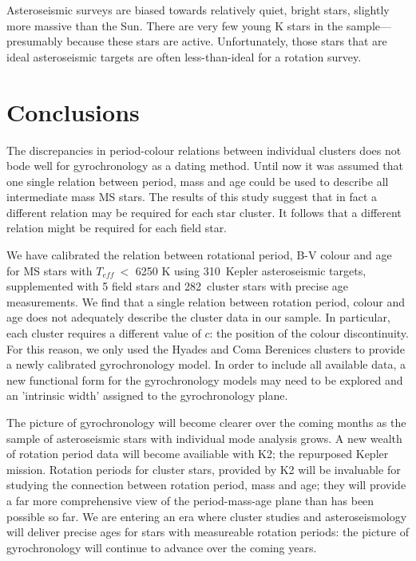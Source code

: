 \documentclass[10pt,preprint]{aastex}
\newcommand{\teff}{$T_{eff}~$}
\newcommand{\nastero}{310~}
\newcommand{\ncluster}{282~}
\begin{document}
Asteroseismic surveys are biased towards relatively quiet, bright stars, slightly more massive than the Sun.
There are very few young K stars in the \citet{Chaplin2013} sample---presumably because these stars are active.
Unfortunately, those stars that are ideal asteroseismic targets are often less-than-ideal for a rotation survey.

\section{Conclusions}
\label{sec:conclusions}

The discrepancies in period-colour relations between individual clusters does not bode well for gyrochronology as a dating method.
Until now it was assumed that one single relation between period, mass and age could be used to describe all intermediate mass MS stars.
The results of this study suggest that in fact a different relation may be required for each star cluster.
It follows that a different relation might be required for each field star.

We have calibrated the relation between rotational period, B-V colour and age for MS stars with \teff $<$ 6250 K using \nastero Kepler asteroseismic targets, supplemented with 5 field stars and \ncluster cluster stars with precise age measurements.
We find that a single relation between rotation period, colour and age does not adequately describe the cluster data in our sample.
In particular, each cluster requires a different value of $c$: the position of the colour discontinuity.
For this reason, we only used the Hyades and Coma Berenices clusters to provide a newly calibrated gyrochronology model.
In order to include all available data, a new functional form for the gyrochronology models may need to be explored and an 'intrinsic width' assigned to the gyrochronology plane.

The picture of gyrochronology  will become clearer over the coming months as the sample of asteroseismic stars with individual mode analysis grows.
A new wealth of rotation period data will become availiable with K2; the repurposed Kepler mission.
Rotation periods for cluster stars, provided by K2 will be invaluable for studying the connection between rotation period, mass and age; they will provide a far more comprehensive view of the period-mass-age plane than has been possible so far.
We are entering an era where cluster studies and asteroseismology will deliver precise ages for stars with measureable rotation periods: the picture of gyrochronology will continue to advance over the coming years.
\end{document}

